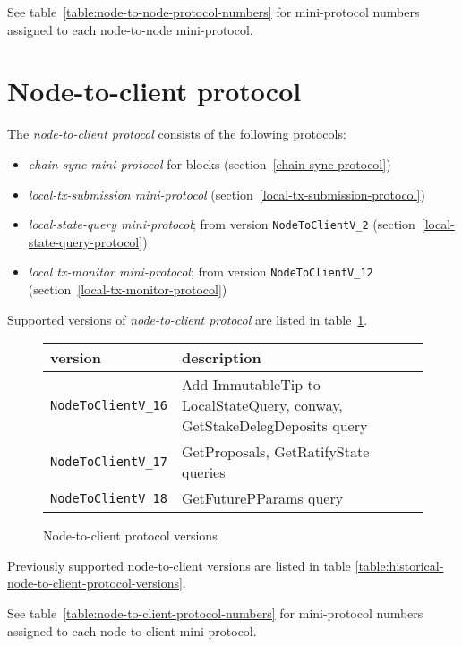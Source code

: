 See table~\ref{table:node-to-node-protocol-numbers} for mini-protocol numbers
assigned to each node-to-node mini-protocol.

\section{Node-to-client protocol}
\label{section:node-to-client-protocol}
\newline
{}\newline

The \textit{node-to-client protocol} consists of the following protocols:
\begin{itemize}
  \item \textit{chain-sync mini-protocol} for blocks (section~\ref{chain-sync-protocol})
  \item \textit{local-tx-submission mini-protocol} (section~\ref{local-tx-submission-protocol})
  \item \textit{local-state-query mini-protocol}; from version \texttt{NodeToClientV\_2} (section~\ref{local-state-query-protocol})
  \item \textit{local tx-monitor mini-protocol}; from version \texttt{NodeToClientV\_12} (section~\ref{local-tx-monitor-protocol})
\end{itemize}
Supported versions of \textit{node-to-client protocol} are listed in
table~\ref{table:node-to-client-protocol-versions}.
\begin{figure}[h]
  \begin{center}
    \begin{tabular}{l|l}
      version & description \\\hline\hline
      \texttt{NodeToClientV\_16} & Add ImmutableTip to LocalStateQuery, conway, GetStakeDelegDeposits query \\\hline
      \texttt{NodeToClientV\_17} & GetProposals, GetRatifyState queries \\\hline
      \texttt{NodeToClientV\_18} & GetFuturePParams query \\\hline
    \end{tabular}
    \caption{Node-to-client protocol versions}
    \label{table:node-to-client-protocol-versions}
  \end{center}
\end{figure}
\newline
Previously supported node-to-client versions are listed in table \ref{table:historical-node-to-client-protocol-versions}.

See table~\ref{table:node-to-client-protocol-numbers} for mini-protocol numbers
assigned to each node-to-client mini-protocol.
